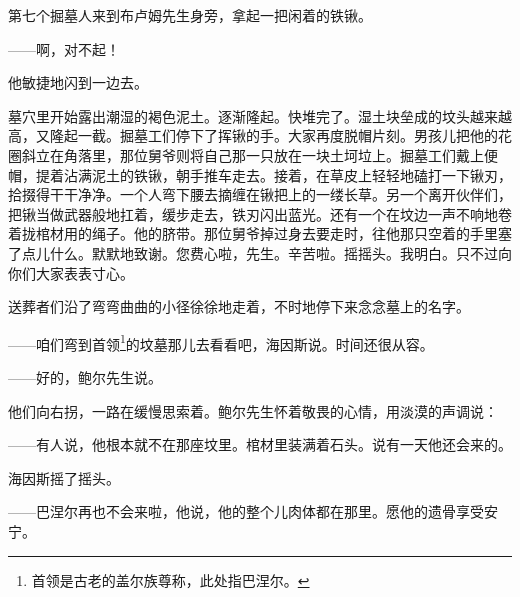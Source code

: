 \par 第七个掘墓人来到布卢姆先生身旁，拿起一把闲着的铁锹。
\par ——啊，对不起！
\par 他敏捷地闪到一边去。
\par 墓穴里开始露出潮湿的褐色泥土。逐渐隆起。快堆完了。湿土块垒成的坟头越来越高，又隆起一截。掘墓工们停下了挥锹的手。大家再度脱帽片刻。男孩儿把他的花圈斜立在角落里，那位舅爷则将自己那一只放在一块土坷垃上。掘墓工们戴上便帽，提着沾满泥土的铁锹，朝手推车走去。接着，在草皮上轻轻地磕打一下锹刃，拾掇得干干净净。一个人弯下腰去摘缠在锹把上的一缕长草。另一个离开伙伴们，把锹当做武器般地扛着，缓步走去，铁刃闪出蓝光。还有一个在坟边一声不响地卷着拢棺材用的绳子。他的脐带。那位舅爷掉过身去要走时，往他那只空着的手里塞了点儿什么。默默地致谢。您费心啦，先生。辛苦啦。摇摇头。我明白。只不过向你们大家表表寸心。
\par 送葬者们沿了弯弯曲曲的小径徐徐地走着，不时地停下来念念墓上的名字。
\par ——咱们弯到首领\footnote{首领是古老的盖尔族尊称，此处指巴涅尔。}的坟墓那儿去看看吧，海因斯说。时间还很从容。
\par ——好的，鲍尔先生说。
\par 他们向右拐，一路在缓慢思索着。鲍尔先生怀着敬畏的心情，用淡漠的声调说：
\par ——有人说，他根本就不在那座坟里。棺材里装满着石头。说有一天他还会来的。
\par 海因斯摇了摇头。
\par ——巴涅尔再也不会来啦，他说，他的整个儿肉体都在那里。愿他的遗骨享受安宁。
